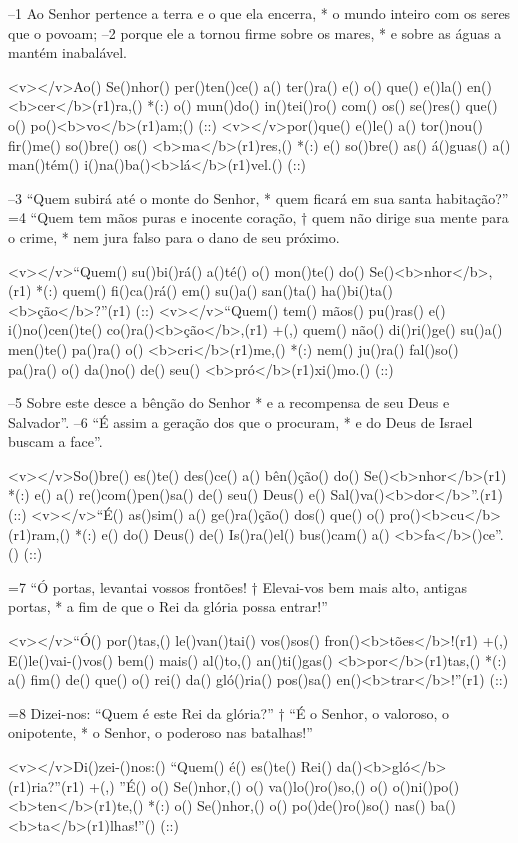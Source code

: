–1 Ao Senhor pertence a terra e o que ela encerra, *
o mundo inteiro com os seres que o povoam; 
–2 porque ele a tornou firme sobre os mares, *
e sobre as águas a mantém inabalável.

<v></v>Ao() Se()nhor() per()ten()ce() a() ter()ra() e() o() que() e()la() en()<b>cer</b>(r1)ra,() *(:)
o() mun()do() in()tei()ro() com() os() se()res() que() o() po()<b>vo</b>(r1)am;() (::)
<v></v>por()que() e()le() a() tor()nou() fir()me() so()bre() os() <b>ma</b>(r1)res,() *(:)
e() so()bre() as() á()guas() a() man()tém() i()na()ba()<b>lá</b>(r1)vel.() (::)

–3 “Quem subirá até o monte do Senhor, *
quem ficará em sua santa habitação?” 
=4 “Quem tem mãos puras e inocente coração, †
quem não dirige sua mente para o crime, *
nem jura falso para o dano de seu próximo.

<v></v>``Quem() su()bi()rá() a()té() o() mon()te() do() Se()<b>nhor</b>,(r1) *(:)
quem() fi()ca()rá() em() su()a() san()ta() ha()bi()ta()<b>ção</b>?''(r1) (::)
<v></v>``Quem() tem() mãos() pu()ras() e() i()no()cen()te() co()ra()<b>ção</b>,(r1) +(,)
quem() não() di()ri()ge() su()a() men()te() pa()ra() o() <b>cri</b>(r1)me,() *(:)
nem() ju()ra() fal()so() pa()ra() o() da()no() de() seu() <b>pró</b>(r1)xi()mo.() (::)

–5 Sobre este desce a bênção do Senhor *
e a recompensa de seu Deus e Salvador”. 
–6 “É assim a geração dos que o procuram, *
e do Deus de Israel buscam a face”.

<v></v>So()bre() es()te() des()ce() a() bên()ção() do() Se()<b>nhor</b>(r1) *(:)
e() a() re()com()pen()sa() de() seu() Deus() e() Sal()va()<b>dor</b>''.(r1) (::)
<v></v>``É() as()sim() a() ge()ra()ção() dos() que() o() pro()<b>cu</b>(r1)ram,() *(:)
e() do() Deus() de() Is()ra()el() bus()cam() a() <b>fa</b>()ce''.() (::)

=7 “Ó portas, levantai vossos frontões! †
Elevai-vos bem mais alto, antigas portas, *
a fim de que o Rei da glória possa entrar!”

<v></v>``Ó() por()tas,() le()van()tai() vos()sos() fron()<b>tões</b>!(r1) +(,)
E()le()vai-()vos() bem() mais() al()to,() an()ti()gas() <b>por</b>(r1)tas,() *(:)
a() fim() de() que() o() rei() da() gló()ria() pos()sa() en()<b>trar</b>!''(r1) (::)

=8 Dizei-nos: “Quem é este Rei da glória?” †
“É o Senhor, o valoroso, o onipotente, *
o Senhor, o poderoso nas batalhas!”

<v></v>Di()zei-()nos:() ``Quem() é() es()te() Rei() da()<b>gló</b>(r1)ria?''(r1) +(,)
''É() o() Se()nhor,() o() va()lo()ro()so,() o() o()ni()po()<b>ten</b>(r1)te,() *(:)
o() Se()nhor,() o() po()de()ro()so() nas() ba()<b>ta</b>(r1)lhas!''() (::)

